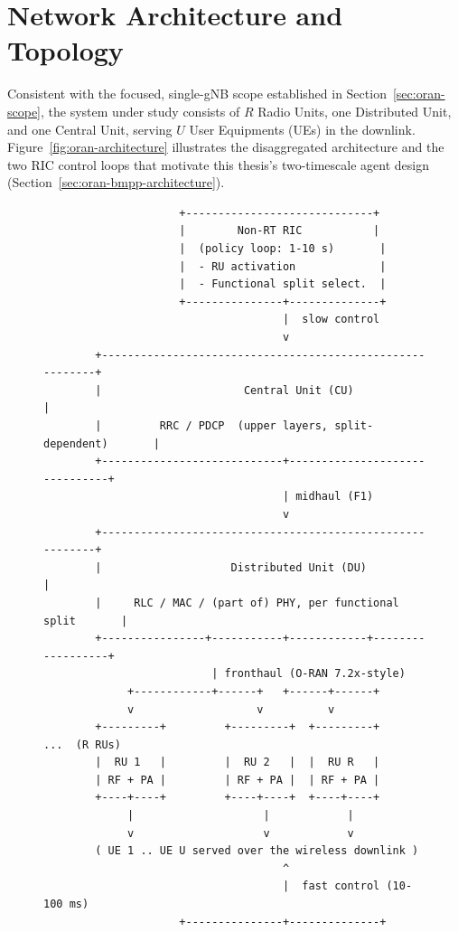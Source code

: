 \section{Network Architecture and Topology}
\label{sec:oran-topology}

Consistent with the focused, single-gNB scope established in
Section~\ref{sec:oran-scope}, the system under study consists of $R$ Radio
Units, one Distributed Unit, and one Central Unit, serving $U$ User
Equipments (UEs) in the downlink. Figure~\ref{fig:oran-architecture}
illustrates the disaggregated architecture and the two RIC control loops
that motivate this thesis's two-timescale agent design
(Section~\ref{sec:oran-bmpp-architecture}).

\begin{figure}[htbp]
\centering
\begin{verbatim}
                     +-----------------------------+
                     |        Non-RT RIC           |
                     |  (policy loop: 1-10 s)       |
                     |  - RU activation             |
                     |  - Functional split select.  |
                     +---------------+--------------+
                                     |  slow control
                                     v
        +----------------------------------------------------------+
        |                      Central Unit (CU)                    |
        |         RRC / PDCP  (upper layers, split-dependent)       |
        +----------------------------+-------------------------------+
                                     | midhaul (F1)
                                     v
        +----------------------------------------------------------+
        |                    Distributed Unit (DU)                  |
        |     RLC / MAC / (part of) PHY, per functional split       |
        +----------------+-----------+------------+------------------+
                          | fronthaul (O-RAN 7.2x-style)
             +------------+------+   +------+------+
             v                   v          v
        +---------+         +---------+  +---------+     ...  (R RUs)
        |  RU 1   |         |  RU 2   |  |  RU R   |
        | RF + PA |         | RF + PA |  | RF + PA |
        +----+----+         +----+----+  +----+----+
             |                    |            |
             v                    v            v
        ( UE 1 .. UE U served over the wireless downlink )
                                     ^
                                     |  fast control (10-100 ms)
                     +---------------+--------------+

\end{verbatim}
\end{figure}
